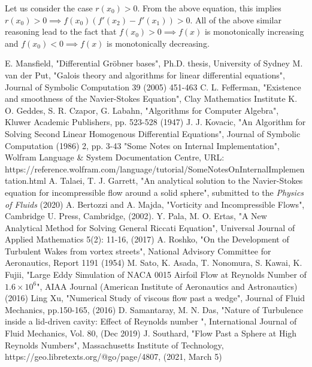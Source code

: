 \documentclass{article}
\begin{document}
Let us consider the case $r(x_0)>0$. From the above equation, this implies $r(x_0)>0 \implies f(x_0)(f'(x_2)-f'(x_1))>0$. All of the above similar reasoning lead to the fact that $f(x_0)>0 \implies f(x)$ is monotonically increasing and $f(x_0)<0 \implies f(x)$ is monotonically decreasing.
\begin{thebibliography}{999}
E. Mansfield, "Differential Gr\"obner bases", Ph.D. thesis, University of Sydney
M. van der Put, "Galois theory and algorithms for linear differential equations", Journal of Symbolic Computation 39 (2005) 451-463
C. L. Fefferman, "Existence and smoothness of the Navier-Stokes Equation", Clay Mathematics Institute
K. O. Geddes, S. R. Czapor, G. Labahn, "Algorithms for Computer Algebra", Kluwer Academic Publishers, pp. 523-528 (1947)
J. J. Kovacic, "An Algorithm for Solving Second Linear Homogenous Differential Equations", Journal of Symbolic Computation (1986) 2, pp. 3-43
"Some Notes on Internal Implementation", Wolfram Language \& System Documentation Centre, URL: https://reference.wolfram.com/language/tutorial/SomeNotesOnInternalImplementation.html
A. Talaei, T. J. Garrett, "An analytical solution to the Navier-Stokes equation for incompressible flow around a solid sphere", submitted to the \textit{Physics of Fluids} (2020)
A. Bertozzi and A. Majda, "Vorticity and Incompressible Flows", Cambridge U. Press, Cambridge, (2002).
Y. Pala, M. O. Ertas, "A New Analytical Method for Solving General Riccati Equation", Universal Journal of Applied Mathematics 5(2): 11-16, (2017)
A. Roshko, "On the Development of Turbulent Wakes from vortex streets", National Advisory Committee for Aeronautics, Report 1191 (1954)
M. Sato, K. Asada, T. Nonomura, S. Kawai, K. Fujii, "Large Eddy Simulation of NACA 0015 Airfoil Flow at Reynolds Number of $1.6\times10^6$", AIAA Journal (American Institute of Aeronautics and Astronautics) (2016)
Ling Xu, "Numerical Study of viscous flow past a wedge", Journal of Fluid Mechanics, pp.150-165, (2016)
D. Samantaray, M. N. Das, "Nature of Turbulence inside a lid-driven cavity: Effect of Reynolds number ", International Journal of Fluid Mechanics, Vol. 80, (Dec 2019)
J. Southard, "Flow Past a Sphere at High Reynolds Numbers", Massachusetts Institute of Technology, https://geo.libretexts.org/@go/page/4807, (2021, March 5)
\end{thebibliography}
\end{document}
